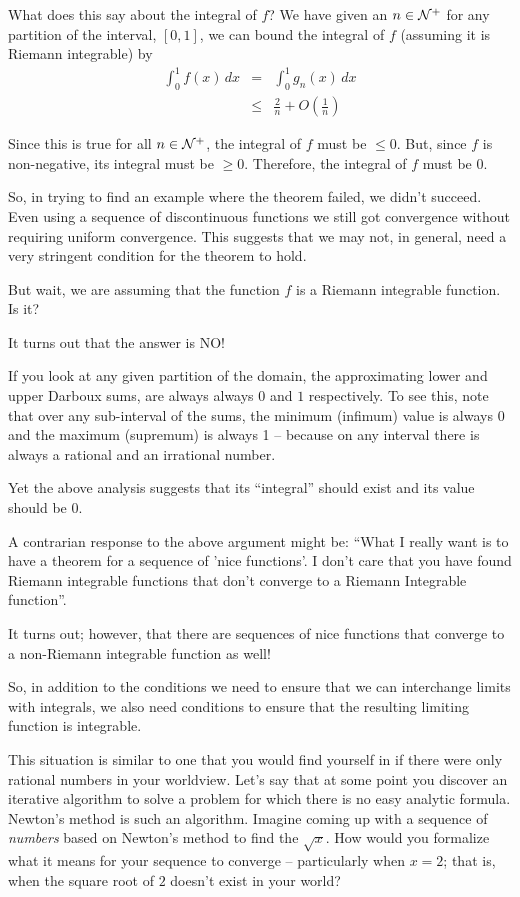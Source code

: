 \documentclass{article}
\begin{document}
What does this say about the integral of $f$? 
We have given an $n \in {\cal N}^+$ for any partition of the interval, $[0,1]$, we can bound the integral of $f$ 
(assuming it is Riemann integrable) by
\begin{eqnarray*}
	\int_0^1 f(x) \, dx & =   & \int_0^1 g_{n}(x) \, dx \\
						& \le & \frac{2}{n} + O\left(\frac{1}{n}\right)
\end{eqnarray*}

Since this is true for all $n \in {\cal N}^+$, the integral of $f$ must be $\le 0$. 
But, since $f$ is non-negative, its integral must be $\ge 0$. Therefore, the 
integral of $f$ must be $0$.

So, in trying to find an example where the theorem failed, we didn't succeed. 
Even using a sequence of discontinuous functions we still got convergence without 
requiring uniform convergence. This suggests that we may not, in general, 
need a very stringent condition for the theorem to hold.

But wait, we are assuming that the function $f$ is a Riemann integrable function. 
Is it?

It turns out that the answer is NO! 

If you look at any given partition of the domain, the approximating lower 
and upper Darboux sums, are always 
always $0$ and $1$ respectively. To see this, note that 
over any sub-interval of the sums, the minimum (infimum) value is always 0 and 
the maximum (supremum) is always 1 -- because on any interval there is always a 
rational and an irrational number.

Yet the above analysis suggests that its ``integral'' should exist and its value 
should be $0$.

A contrarian response to the above argument might be:
``What I really want is to have a theorem for a sequence of 
'nice functions'. I don't care that you have found Riemann integrable functions that
don't converge to a Riemann Integrable function''. 

It turns out; however, that there are sequences of nice functions that converge 
to a non-Riemann integrable function as well!

So, in addition to the conditions we need to ensure that we can interchange 
limits with integrals, we also need conditions to ensure that the 
resulting limiting function is integrable.

This situation is similar to one that you would find yourself in if there were 
only rational numbers in your worldview. Let's say that at some point 
you discover an iterative 
algorithm to solve a problem for which there is no easy analytic formula. 
Newton's method is such an algorithm. Imagine coming up with a sequence of {\em numbers\/}
based on Newton's method to find the $\sqrt{x}$. How would you formalize what 
it means for your sequence to converge -- particularly when $x = 2$; that is, when the
square root of $2$ doesn't exist in your world?
\end{document}
